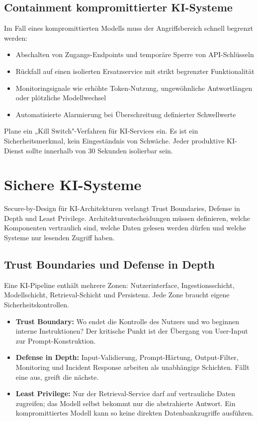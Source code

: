 \subsection{Containment kompromittierter KI-Systeme}

Im Fall eines kompromittierten Modells muss der Angriffsbereich schnell begrenzt werden:

\begin{itemize}[leftmargin=*]
    \item Abschalten von Zugangs-Endpoints und temporäre Sperre von API-Schlüsseln
    \item Rückfall auf einen isolierten Ersatzservice mit strikt begrenzter Funktionalität
    \item Monitoringsignale wie erhöhte Token-Nutzung, ungewöhnliche Antwortlängen oder plötzliche Modellwechsel
    \item Automatisierte Alarmierung bei Überschreitung definierter Schwellwerte
\end{itemize}

\begin{praxishinweis}
Plane ein „Kill Switch"-Verfahren für KI-Services ein. Es ist ein Sicherheitsmerkmal, kein Eingeständnis von Schwäche. Jeder produktive KI-Dienst sollte innerhalb von 30 Sekunden isolierbar sein.
\end{praxishinweis}

\section{Sichere KI-Systeme}

Secure-by-Design für KI-Architekturen verlangt Trust Boundaries, Defense in Depth und Least Privilege. Architekturentscheidungen müssen definieren, welche Komponenten vertraulich sind, welche Daten gelesen werden dürfen und welche Systeme nur lesenden Zugriff haben.

\subsection{Trust Boundaries und Defense in Depth}

Eine KI-Pipeline enthält mehrere Zonen: Nutzerinterface, Ingestionsschicht, Modellschicht, Retrieval-Schicht und Persistenz. Jede Zone braucht eigene Sicherheitskontrollen.

\begin{itemize}[leftmargin=*]
    \item \textbf{Trust Boundary:} Wo endet die Kontrolle des Nutzers und wo beginnen interne Instruktionen? Der kritische Punkt ist der Übergang von User-Input zur Prompt-Konstruktion.
    \item \textbf{Defense in Depth:} Input-Validierung, Prompt-Härtung, Output-Filter, Monitoring und Incident Response arbeiten als unabhängige Schichten. Fällt eine aus, greift die nächste.
    \item \textbf{Least Privilege:} Nur der Retrieval-Service darf auf vertrauliche Daten zugreifen; das Modell selbst bekommt nur die abstrahierte Antwort. Ein kompromittiertes Modell kann so keine direkten Datenbankzugriffe ausführen.
\end{itemize}


